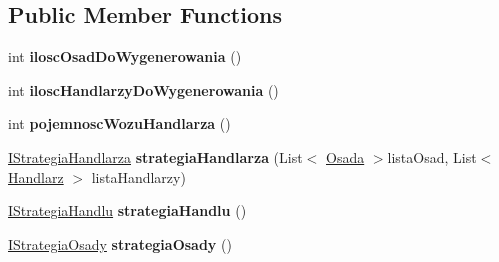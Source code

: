 \subsection*{Public Member Functions}
\begin{DoxyCompactItemize}
\item 
\hypertarget{class_empire___simulator_1_1_podstawowa_strategia_generowania_swiata_ae20cc6da6e2488cc8f390345a990205b}{int {\bfseries ilosc\+Osad\+Do\+Wygenerowania} ()}\label{class_empire___simulator_1_1_podstawowa_strategia_generowania_swiata_ae20cc6da6e2488cc8f390345a990205b}

\item 
\hypertarget{class_empire___simulator_1_1_podstawowa_strategia_generowania_swiata_ad6fde99a86ea7e05a266fdbb26fa1a5a}{int {\bfseries ilosc\+Handlarzy\+Do\+Wygenerowania} ()}\label{class_empire___simulator_1_1_podstawowa_strategia_generowania_swiata_ad6fde99a86ea7e05a266fdbb26fa1a5a}

\item 
\hypertarget{class_empire___simulator_1_1_podstawowa_strategia_generowania_swiata_a0b8b25ecba4d2128ad665db882d04c9e}{int {\bfseries pojemnosc\+Wozu\+Handlarza} ()}\label{class_empire___simulator_1_1_podstawowa_strategia_generowania_swiata_a0b8b25ecba4d2128ad665db882d04c9e}

\item 
\hypertarget{class_empire___simulator_1_1_podstawowa_strategia_generowania_swiata_a24e2b1b4c6513295abfa1d1b806b6ad8}{\hyperlink{interface_empire___simulator_1_1_i_strategia_handlarza}{I\+Strategia\+Handlarza} {\bfseries strategia\+Handlarza} (List$<$ \hyperlink{class_empire___simulator_1_1_osada}{Osada} $>$lista\+Osad, List$<$ \hyperlink{class_empire___simulator_1_1_handlarz}{Handlarz} $>$ lista\+Handlarzy)}\label{class_empire___simulator_1_1_podstawowa_strategia_generowania_swiata_a24e2b1b4c6513295abfa1d1b806b6ad8}

\item 
\hypertarget{class_empire___simulator_1_1_podstawowa_strategia_generowania_swiata_a768550bd1c8b8363f9779d1a02e50286}{\hyperlink{interface_empire___simulator_1_1_i_strategia_handlu}{I\+Strategia\+Handlu} {\bfseries strategia\+Handlu} ()}\label{class_empire___simulator_1_1_podstawowa_strategia_generowania_swiata_a768550bd1c8b8363f9779d1a02e50286}

\item 
\hypertarget{class_empire___simulator_1_1_podstawowa_strategia_generowania_swiata_a0a2d7749efdcc7ccbb6143f28502a287}{\hyperlink{interface_empire___simulator_1_1_i_strategia_osady}{I\+Strategia\+Osady} {\bfseries strategia\+Osady} ()}\label{class_empire___simulator_1_1_podstawowa_strategia_generowania_swiata_a0a2d7749efdcc7ccbb6143f28502a287}

\end{DoxyCompactItemize}


